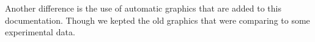 Another difference is the use of automatic graphics that are added to this documentation. Though we kepted the old graphics that were comparing to some experimental data. 



